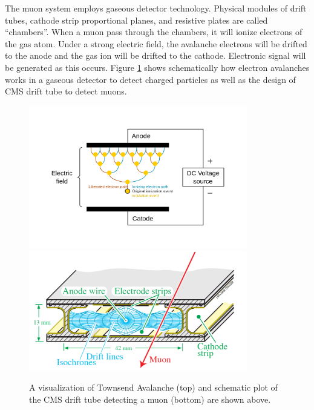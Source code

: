 
The muon system employs gaseous detector technology. Physical modules of drift tubes, cathode strip proportional planes, and resistive plates are called ``chambers''. When a muon pass through the chambers, it will ionize electrons of the gas atom. Under a strong electric field, the avalanche electrons will be drifted to the anode and the gas ion will be drifted to the cathode. Electronic signal will be generated as this occurs. Figure \ref{Muonsystem} shows schematically how electron avalanches works in a gaseous detector to detect charged particles as well as the design of CMS drift tube to detect muons.


\begin{figure}[hbtp]
\begin{center}
\includegraphics[width=0.85\textwidth]{Figures/Chapter3/EAva.png}
\includegraphics[width=0.85\textwidth]{Figures/Chapter3/CMSDT.png}
\caption{A visualization of Townsend Avalanche (top) and schematic plot of the CMS drift tube detecting a muon (bottom) are shown above.}
\label{Muonsystem}
\end{center}
\end{figure} 


